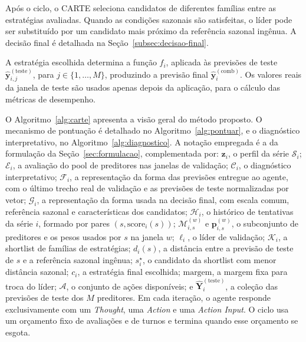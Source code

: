 Após o ciclo, o CARTE seleciona candidatos de diferentes famílias entre as estratégias avaliadas. Quando as condições sazonais são satisfeitas, o líder pode ser substituído por um candidato mais próximo da referência sazonal ingênua. A decisão final é detalhada na Seção~\ref{subsec:decisao-final}.


A estratégia escolhida determina a função $f_i$, aplicada às previsões de teste $\hat{\mathbf{y}}_{i,j}^{(\mathrm{teste})}$, para $j \in \{1,\dots,M\}$, produzindo a previsão final $\hat{\mathbf{y}}_i^{(\mathrm{comb})}$. Os valores reais da janela de teste são usados apenas depois da aplicação, para o cálculo das métricas de desempenho.


O Algoritmo~\ref{alg:carte} apresenta a visão geral do método proposto. O mecanismo de pontuação é detalhado no Algoritmo~\ref{alg:pontuar}, e o diagnóstico interpretativo, no Algoritmo~\ref{alg:diagnostico}. A notação empregada é a da formulação da Seção~\ref{sec:formulacao}, complementada por: $\mathbf{z}_i$, o perfil da série $\mathcal{S}_i$; $\mathcal{E}_i$, a avaliação do pool de preditores nas janelas de validação; $\mathcal{C}_i$, o diagnóstico interpretativo; $\mathcal{F}_i$, a representação da forma das previsões entregue ao agente, com o último trecho real de validação e as previsões de teste normalizadas por vetor; $\mathcal{G}_i$, a representação da forma usada na decisão final, com escala comum, referência sazonal e características dos candidatos; $\mathcal{H}_i$, o histórico de tentativas da série $i$, formado por pares $(s, \text{score}_i(s))$; $\mathcal{M}_{i,s}^{(w)}$ e $\mathbf{p}_{i,s}^{(w)}$, o subconjunto de preditores e os pesos usados por $s$ na janela $w$; $\ell_i$, o líder de validação; $\mathcal{K}_i$, a shortlist de famílias de estratégias; $d_i(s)$, a distância entre a previsão de teste de $s$ e a referência sazonal ingênua; $s_i^{\star}$, o candidato da shortlist com menor distância sazonal; $c_i$, a estratégia final escolhida; $\text{margem}$, a margem fixa para troca do líder; $\mathcal{A}$, o conjunto de ações disponíveis; e $\hat{\mathbf{Y}}_i^{(\mathrm{teste})}$, a coleção das previsões de teste dos $M$ preditores. Em cada iteração, o agente responde exclusivamente com um \textit{Thought}, uma \textit{Action} e uma \textit{Action Input}. O ciclo usa um orçamento fixo de avaliações e de turnos e termina quando esse orçamento se esgota.


